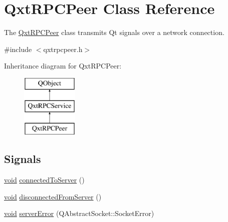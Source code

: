 \hypertarget{class_qxt_r_p_c_peer}{\section{Qxt\-R\-P\-C\-Peer Class Reference}
\label{class_qxt_r_p_c_peer}
}


The \hyperlink{class_qxt_r_p_c_peer}{Qxt\-R\-P\-C\-Peer} class transmits Qt signals over a network connection.  




{\ttfamily \#include $<$qxtrpcpeer.\-h$>$}

Inheritance diagram for Qxt\-R\-P\-C\-Peer\-:\begin{figure}[H]
\begin{center}
\leavevmode
\includegraphics[height=3.000000cm]{class_qxt_r_p_c_peer}
\end{center}
\end{figure}
\subsection*{Signals}
\begin{DoxyCompactItemize}
\item 
\hyperlink{group___u_a_v_objects_plugin_ga444cf2ff3f0ecbe028adce838d373f5c}{void} \hyperlink{class_qxt_r_p_c_peer_a5d62761c1dc7620ee7dc5b73d808a1f7}{connected\-To\-Server} ()
\item 
\hyperlink{group___u_a_v_objects_plugin_ga444cf2ff3f0ecbe028adce838d373f5c}{void} \hyperlink{class_qxt_r_p_c_peer_a0f854addfc6077692d9e76cef662c54c}{disconnected\-From\-Server} ()
\item 
\hyperlink{group___u_a_v_objects_plugin_ga444cf2ff3f0ecbe028adce838d373f5c}{void} \hyperlink{class_qxt_r_p_c_peer_a7f3d0bda11e08ba5dbf5861315d1ff90}{server\-Error} (Q\-Abstract\-Socket\-::\-Socket\-Error)
\end{DoxyCompactItemize}
